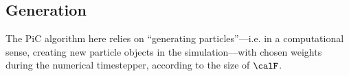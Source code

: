 \subsection*{Generation}
    The PiC algorithm here relies on ``generating particles''---i.e. in a computational sense, creating new particle objects in the simulation---with chosen weights during the numerical timestepper, according to the size of $\calF$.

    